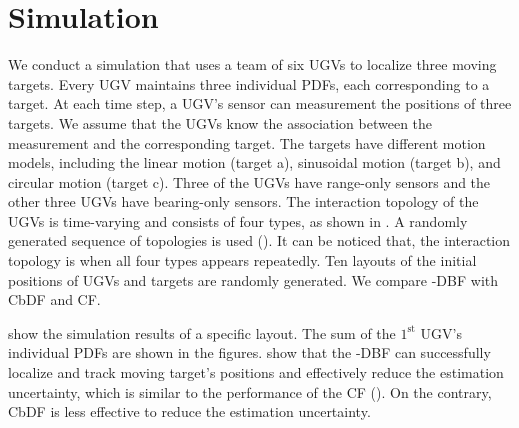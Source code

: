 \section{Simulation}\label{sec:sim}
	We conduct a simulation that uses a team of six UGVs to localize three moving targets.
	Every UGV maintains three individual PDFs, each corresponding to a target.
	At each time step, a UGV's sensor can measurement the positions of three targets.
	We assume that the UGVs know the association between the measurement and the corresponding target.
	The targets have different motion models, including the linear motion (target a), sinusoidal motion (target b), and circular motion (target c).
	Three of the UGVs have range-only sensors and the other three UGVs have bearing-only sensors.
	The interaction topology of the UGVs is time-varying and consists of four types, as shown in .
	A randomly generated sequence of topologies is used (\Cref{}).
	It can be noticed that, the interaction topology is \fc when all four types appears repeatedly.
	Ten layouts of the initial positions of UGVs and targets are randomly generated.
	We compare \proto-DBF with CbDF and CF.
	
	 show the simulation results of a specific layout.
	The sum of the $1^\text{st}$ UGV's individual PDFs are shown in the figures.
	 show that the \proto-DBF can successfully localize and track moving target's positions and effectively reduce the estimation uncertainty, which is similar to the performance of the CF ().
	On the contrary, CbDF is less effective to reduce the estimation uncertainty.
	
